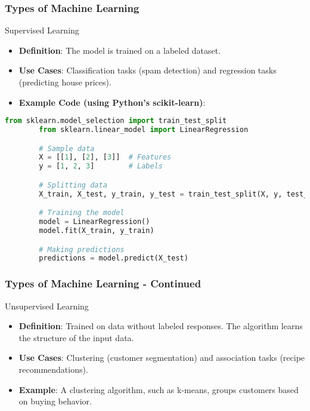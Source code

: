 \documentclass[aspectratio=169]{beamer}
\begin{document}
\begin{frame}[fragile]
    \frametitle{Types of Machine Learning}
    \begin{block}{Supervised Learning}
        \begin{itemize}
            \item \textbf{Definition}: The model is trained on a labeled dataset. 
            \item \textbf{Use Cases}: Classification tasks (spam detection) and regression tasks (predicting house prices).
            \item \textbf{Example Code (using Python's scikit-learn)}:
        \end{itemize}
        \begin{lstlisting}[language=Python]
        from sklearn.model_selection import train_test_split
        from sklearn.linear_model import LinearRegression

        # Sample data
        X = [[1], [2], [3]]  # Features
        y = [1, 2, 3]        # Labels

        # Splitting data
        X_train, X_test, y_train, y_test = train_test_split(X, y, test_size=0.2)

        # Training the model
        model = LinearRegression()
        model.fit(X_train, y_train)

        # Making predictions
        predictions = model.predict(X_test)
        \end{lstlisting}
    \end{block}
\end{frame}

\begin{frame}[fragile]
    \frametitle{Types of Machine Learning - Continued}
    \begin{block}{Unsupervised Learning}
        \begin{itemize}
            \item \textbf{Definition}: Trained on data without labeled responses. The algorithm learns the structure of the input data.
            \item \textbf{Use Cases}: Clustering (customer segmentation) and association tasks (recipe recommendations).
            \item \textbf{Example}: A clustering algorithm, such as k-means, groups customers based on buying behavior.
        \end{itemize}
    \end{block}
\end{frame}
\end{document}
